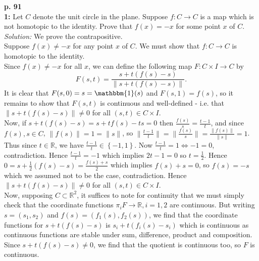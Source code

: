 \documentclass[a4paper]{article}
\begin{document}
    \textbf{p. 91}\\
    \textbf{1:} Let $C$ denote the unit circle in the plane.
    Suppose $f  \colon C \to C$ is a map which is not homotopic to
    the identity. Prove that $f(x) = -x$ for some point 
    $x$ of $C$.\\
    \linebreak
    \textit{Solution:}
    We prove the contrapositive.\\
    Suppose $f(x) \neq -x$ for any point $x$ of $C$. We must show that 
    $f  \colon C \to C$ is homotopic to the identity.\\
    \linebreak
    Since $f(x) \neq -x$ for all $x$, we can define the following map
    $F  \colon C \times I \to C$ by
    \[
       F(s,t) = \frac{s + t \left( f(s) - s \right)     
        }{\| s + t \left( f(s)-s \right) \|}.
    \] 
    It is clear that $F(s,0) = s = \mathbbm{1} (s)$ and
    $F(s,1) = f(s)$, so it remains to show that
    $F(s,t)$ is continuous and well-defined - i.e. that
    $\|s + t \left( f(s) -s \right) \|\neq 0$ for all
    $(s,t) \in C \times I$.\\
    Now, if $s + t \left( f(s) -s \right) = 
    s + t f(s) - ts= 0$ then 
    $\frac{f(s)}{s} = \frac{t-1}{t}$, and since
    $f(s), s \in C$, $\|f(s)\| = 1 = \|s\|$, so
    $\|\frac{t-1}{t}\|= \| \frac{f(s)}{s}\|
    = \frac{\|f(s)\|}{\|s\|} = 1$. Thus since $t \in \mathbb{R}$, we have
    $\frac{t-1}{t} \in \left\{ -1,1 \right\} $. Now
    $\frac{t-1}{t} = 1 \iff -1 = 0$, contradiction. Hence
    $\frac{t-1}{t} = -1$ which implies
    $2t -1 = 0$ so $t = \frac{1}{2}$. Hence
    $ 0 = s + \frac{1}{2} \left( f(s)-s \right) 
    = \frac{f(s)+s}{2}$ which implies
    $f(s) + s = 0$, so $f(s) = -s$ which we assumed not to be the case,
    contradiction. Hence
    $\|s + t\left( f(s) - s \right) \|\neq 0$ for all
    $(s,t) \in C \times I$.\\
    \linebreak
    Now, supposing $C \subset \mathbb{R}^2$, it suffices to
    note for continuity that we must simply check that the
    coordinate functions
    $\pi_i F \to \mathbb{R}, i = 1,2$ are continuous. 
    But writing $s = (s_1, s_2)$ and
    $f(s) = (f_1(s), f_2(s))$, we find that the coordinate functions
    for $s + t \left( f(s) - s \right) $ is
    $s_i + t (f_i(s) - s_i)$ which is continuous as continuous functions are
    stable under sum, difference, product and composition.
    Since $s + t\left( f(s) - s \right) \neq 0$, we find that
    the quotient is continuous too, so $F$ is continuous.\\
    \linebreak
\end{document}

